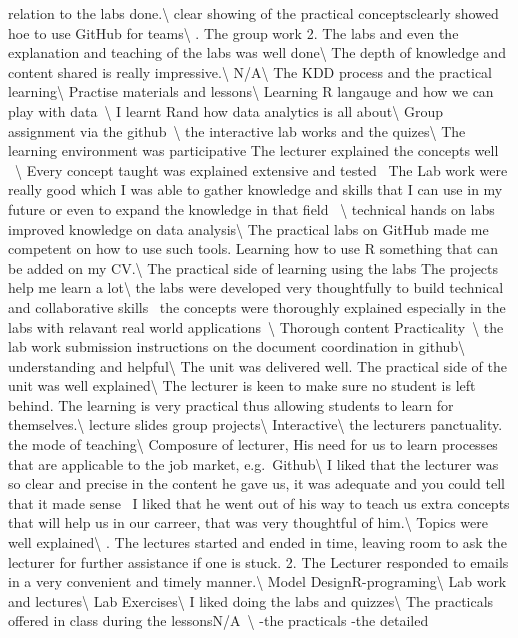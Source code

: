 \documentclass[
]{article}
\begin{document}
{relation to the labs done.\textbackslash{} \hline clear showing of the
practical conceptsclearly showed hoe to use GitHub for
teams\textbackslash{} . The group work 2. The labs and even the explanation and teaching of
the labs was well done\textbackslash{} \hline The depth of knowledge and
content shared is really impressive.\textbackslash{} \hline
N/A\textbackslash{} \hline The KDD process and the practical
learning\textbackslash{} \hline Practise materials and
lessons\textbackslash{} \hline Learning R langauge and how we can play
with data~\textbackslash{} \hline I learnt Rand how data analytics is
all about\textbackslash{} \hline Group assignment via the
github~\textbackslash{} \hline the interactive lab works and the
quizes\textbackslash{} \hline The learning environment was participative
The lecturer explained the concepts well ~\textbackslash{} \hline Every
concept taught was explained extensive and tested~ The Lab work were
really good which I was able to gather knowledge and skills that I can
use in my future or even to expand the knowledge in that field
~\textbackslash{} \hline technical hands on labs improved knowledge on
data analysis\textbackslash{} \hline The practical labs on GitHub made
me competent on how to use such tools. Learning how to use R something
that can be added on my CV.\textbackslash{} \hline The practical side of
learning using the labs The projects help me learn a lot\textbackslash{}
\hline the labs were developed very thoughtfully to build technical and
collaborative skills~ the concepts were thoroughly explained especially
in the labs with relavant real world applications~\textbackslash{}
\hline Thorough content Practicality~\textbackslash{} \hline the lab
work submission instructions on the document coordination in
github\textbackslash{} \hline understanding and helpful\textbackslash{}
\hline The unit was delivered well. The practical side of the unit was
well explained\textbackslash{} \hline The lecturer is keen to make sure
no student is left behind. The learning is very practical thus allowing
students to learn for themselves.\textbackslash{} \hline lecture slides
group projects\textbackslash{} \hline Interactive\textbackslash{} \hline
the lecturers panctuality. the mode of teaching\textbackslash{} \hline
Composure of lecturer, His need for us to learn processes that are
applicable to the job market, e.g.~Github\textbackslash{} \hline I liked
that the lecturer was so clear and precise in the content he gave us, it
was adequate and you could tell that it made sense~ I liked that he went
out of his way to teach us extra concepts that will help us in our
carreer, that was very thoughtful of him.\textbackslash{} \hline Topics
were well explained\textbackslash{} . The lectures started and ended in time, leaving room to ask the
lecturer for further assistance if one is stuck. 2. The Lecturer
responded to emails in a very convenient and timely
manner.\textbackslash{} \hline Model DesignR-programing\textbackslash{}
\hline Lab work and lectures\textbackslash{} \hline Lab
Exercises\textbackslash{} \hline I liked doing the labs and
quizzes\textbackslash{} \hline The practicals offered in class during
the lessonsN/A~\textbackslash{} \hline }-the practicals -the detailed
\end{document}
